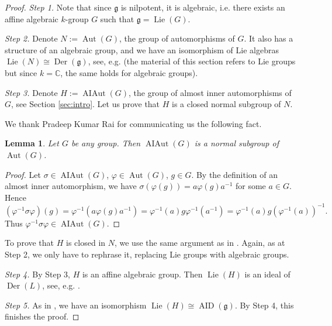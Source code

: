 \documentclass[11pt,reqno]{amsart}
\numberwithin{equation}{section}
\newtheorem{lemma}[theorem]{Lemma}
\theoremstyle{definition}
\newcommand{\Aut}{{\operatorname{ Aut}}}
\newcommand{\AIAut}{{\operatorname{ AIAut}}}
\newcommand{\AID}{{\operatorname{ AID}}}
\newcommand{\Der}{{\operatorname{ Der}}}
\newcommand{\Lie}{{\operatorname{ Lie}}}
\def\g{\mathfrak g}
\begin{document}
\begin{proof}
{\it Step 1.}
Note that since $\g$ is nilpotent, it is algebraic, i.e. there exists
an affine algebraic $k$-group $G$ such that $\g=\Lie (G)$.

{\it Step 2.}
Denote $N:=\Aut (G)$, the group of automorphisms of $G$. It also has a structure of
an algebraic group, and we have an isomorphism of Lie algebras $\Lie (N)\cong \Der(\g)$,
see, e.g. \cite[Section~I.2.10]{OV} (the material of this section refers to Lie groups
but since $k=\mathbb C$, the same holds for algebraic groups).

{\it Step 3.} Denote $H:=\AIAut(G)$, the group of almost inner automorphisms of $G$,
see Section \ref{sec:intro}. Let us prove that $H$ is a closed normal subgroup of $N$.

We thank Pradeep Kumar Rai
for communicating us the following  fact. %

\begin{lemma} \label{lem:norm}
Let $G$ be any group. Then $\AIAut(G)$ is a normal subgroup of $\Aut(G)$.
\end{lemma}

\begin{proof}
Let $\sigma\in\AIAut(G)$, $\varphi\in\Aut (G)$, $g\in G$. By the definition of
an almost inner automorphism, we have $\sigma(\varphi (g))=a\varphi (g)a^{-1}$
for some $a\in G$. Hence
$$
(\varphi^{-1}\sigma\varphi)(g) = \varphi^{-1}(a\varphi (g)a^{-1})
= \varphi^{-1}(a) g \varphi^{-1}(a^{-1}) = \varphi^{-1}(a) g (\varphi^{-1}(a))^{-1}.
$$
Thus $\varphi^{-1}\sigma\varphi\in\AIAut (G)$.
\end{proof}


To prove that $H$ is closed in $N$, we use the same argument as in \cite{GW}. Again,
as at Step 2, we only have to rephrase it, replacing Lie groups with algebraic groups.



{\it Step 4.} By Step 3, $H$ is an affine algebraic group. Then $\Lie(H)$ is an
ideal of $\Der(L)$, see, e.g. \cite[10.2,~Cor.~A]{Hu}.

{\it Step 5.} As in \cite{GW}, we have an isomorphism $\Lie (H)\cong \AID(\g)$.
By Step 4, this finishes the proof.

\end{proof}
\end{document}
